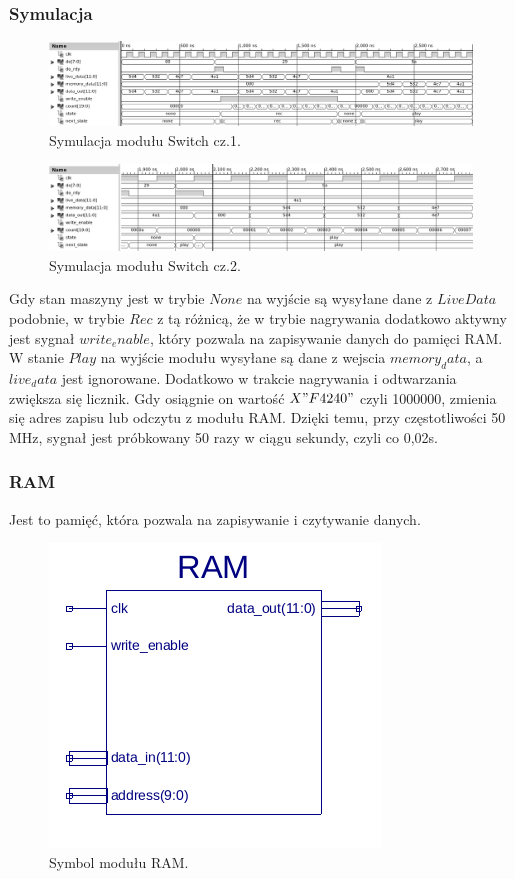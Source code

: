 \documentclass[a4paper,11pt]{article}
\begin{document}
\subsubsection*{Symulacja}
\begin{figure}[H]
\center
\includegraphics[scale=0.6]{switchsym1bw.png}
\caption{Symulacja modułu Switch cz.1.}
\end{figure}

\begin{figure}[H]
\center
\includegraphics[scale=0.6]{switchsym2bw.png}
\caption{Symulacja modułu Switch cz.2.}
\end{figure}

Gdy stan maszyny jest w trybie $None$ na wyjście są wysyłane dane z $LiveData$ podobnie, w trybie $Rec$ z tą różnicą, że w trybie nagrywania dodatkowo aktywny jest sygnał $write_enable$, który pozwala na zapisywanie danych do pamięci RAM. W stanie $Play$ na wyjście modułu wysyłane są dane z wejscia $memory_data$, a $live_data$ jest ignorowane. Dodatkowo w trakcie nagrywania i odtwarzania zwiększa się licznik. Gdy osiągnie on wartość $X"F4240"$ czyli 1000000, zmienia się adres zapisu lub odczytu z modułu RAM. Dzięki temu, przy częstotliwości 50 MHz, sygnał jest próbkowany 50 razy w ciągu sekundy, czyli co 0,02s.

\subsubsection{RAM}
Jest to pamięć, która pozwala na zapisywanie i czytywanie danych.

\begin{figure}[H]
\center
\includegraphics[scale=0.8]{ramsymb.png}
\caption{Symbol modułu RAM.}
\end{figure}
\end{document}
